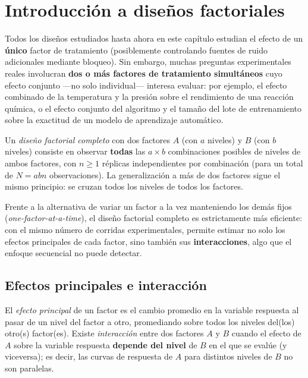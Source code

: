\section{Introducción a diseños factoriales}

Todos los diseños estudiados hasta ahora en este capítulo estudian el efecto de un \textbf{único} factor de tratamiento (posiblemente controlando fuentes de ruido adicionales mediante bloqueo). Sin embargo, muchas preguntas experimentales reales involucran \textbf{dos o más factores de tratamiento simultáneos} cuyo efecto conjunto —no solo individual— interesa evaluar: por ejemplo, el efecto combinado de la temperatura y la presión sobre el rendimiento de una reacción química, o el efecto conjunto del algoritmo y el tamaño del lote de entrenamiento sobre la exactitud de un modelo de aprendizaje automático.

\begin{definicion}
	Un \emph{diseño factorial completo} con dos factores $A$ (con $a$ niveles) y $B$ (con $b$ niveles) consiste en observar \textbf{todas} las $a \times b$ combinaciones posibles de niveles de ambos factores, con $n \geq 1$ réplicas independientes por combinación (para un total de $N = abn$ observaciones). La generalización a más de dos factores sigue el mismo principio: se cruzan todos los niveles de todos los factores.
\end{definicion}

\begin{observacion}
	Frente a la alternativa de variar un factor a la vez manteniendo los demás fijos (\emph{one-factor-at-a-time}), el diseño factorial completo es estrictamente más eficiente: con el mismo número de corridas experimentales, permite estimar no solo los efectos principales de cada factor, sino también sus \textbf{interacciones}, algo que el enfoque secuencial no puede detectar.
\end{observacion}

\subsection{Efectos principales e interacción}

\begin{definicion}
	El \emph{efecto principal} de un factor es el cambio promedio en la variable respuesta al pasar de un nivel del factor a otro, promediando sobre todos los niveles del(los) otro(s) factor(es). Existe \emph{interacción} entre dos factores $A$ y $B$ cuando el efecto de $A$ sobre la variable respuesta \textbf{depende del nivel} de $B$ en el que se evalúe (y viceversa); es decir, las curvas de respuesta de $A$ para distintos niveles de $B$ no son paralelas.
\end{definicion}

